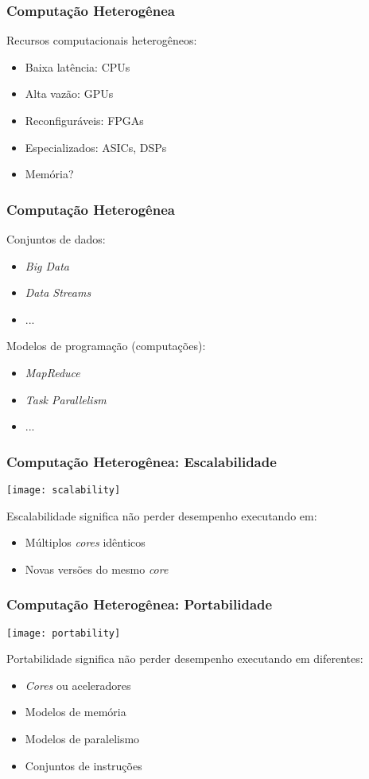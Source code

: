 \documentclass[10pt, compress, aspectratio=43, xcolor={table,usenames,dvipsnames}]{beamer}
\begin{document}
\begin{frame}
    \frametitle{Computação Heterogênea}
    Recursos computacionais \alert{heterogêneos}:
    \begin{itemize}
        \item Baixa latência: CPUs
        \item Alta vazão: GPUs
        \item Reconfiguráveis: FPGAs
        \item Especializados: ASICs, DSPs
        \item Memória?
    \end{itemize}
\end{frame}

\begin{frame}
    \frametitle{Computação Heterogênea}
    Conjuntos de \alert{dados}:
    \begin{itemize}
        \item \textit{Big Data}
        \item \textit{Data Streams}
        \item ...
    \end{itemize}
    Modelos de programação (\alert{computações}):
    \begin{itemize}
        \item \textit{MapReduce}
        \item \textit{Task Parallelism}
        \item ...
    \end{itemize}
\end{frame}

\begin{frame}
    \frametitle{Computação Heterogênea: Escalabilidade}
    \begin{center}
        \texttt{[image: scalability]}
    \end{center}

    \alert{Escalabilidade} significa não perder desempenho
        executando em:
    \begin{itemize}
        \item Múltiplos \textit{cores} idênticos
        \item Novas versões do mesmo \textit{core}
    \end{itemize}
\end{frame}

\begin{frame}
    \frametitle{Computação Heterogênea: Portabilidade}
    \begin{center}
        \texttt{[image: portability]}
    \end{center}

    \alert{Portabilidade} significa não perder desempenho
        executando em diferentes:
    \begin{itemize}
        \item \textit{Cores} ou \alert{aceleradores}
        \item Modelos de memória
        \item Modelos de paralelismo
        \item Conjuntos de instruções
    \end{itemize}
\end{frame}
\end{document}
